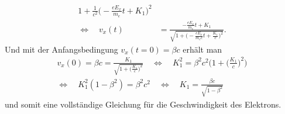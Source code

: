 \begin{beispiel}
\begin{align*}
    {1 + \frac{1}{c^2}\biggl(-\frac{e E_x}{m_e}t + K_1\biggr)^2}\\
    \Leftrightarrow\quad
    v_x(t) &= \frac{-\frac{e E_x}{m_e}t + K_1}
    {\sqrt{1+\biggl(-\frac{eE_x}{m_e c}t+\frac{K_1}{c}\biggr)^2}}.
\end{align*}
Und mit der Anfangsbedingung \(v_x(t=0)=\beta c\) erhält man
\begin{multline*}
    v_x(0) = \beta c = \frac{K_1}{\sqrt{1+\biggl(\frac{K_1}{c}\biggr)^2}}\quad
    \Leftrightarrow\quad K_1^2 = \beta^2 c^2 \Biggl(1+\Biggl(\frac{K_1}{c}\Biggr)^2\Biggr)\\
    \Leftrightarrow\quad K_1^2 (1-\beta^2) = \beta^2 c^2\quad
    \Leftrightarrow\quad K_1 = \frac{\beta c}{\sqrt{1-\beta^2}}
\end{multline*}
und somit eine vollständige Gleichung für die Geschwindigkeit des Elektrons.


\end{beispiel}

